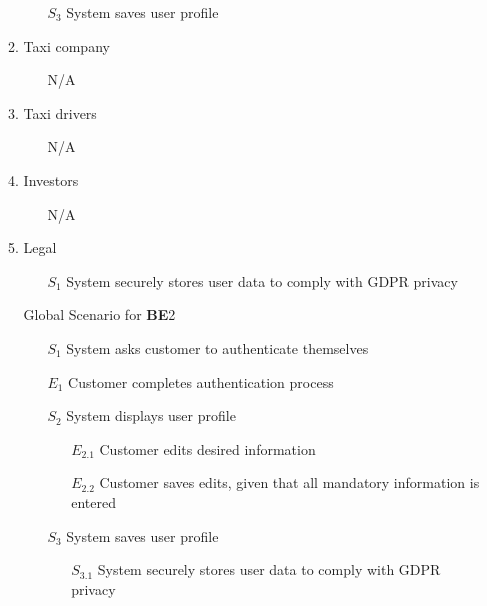 \documentclass[]{article}
\begin{document}
\begin{enumerate}[{\textbf{BE}}1.]
\begin{enumerate}[{\textbf{VP2}}.1]
\begin{enumerate}
                \item[$S_3$] System saves user profile
            \end{enumerate}
        \item Taxi company
            \begin{enumerate}
                \item[N/A]
            \end{enumerate}
        \item Taxi drivers
            \begin{enumerate}
                \item[N/A]
            \end{enumerate}
        \item Investors
            \begin{enumerate}
                \item[N/A]
            \end{enumerate}
        \item Legal
            \begin{enumerate}
                \item[$S_1$] System securely stores user data to comply with GDPR privacy
            \end{enumerate}
        \item[Global] Scenario for \textbf{BE}2
            \begin{enumerate}
                \item[$S_1$] System asks customer to authenticate themselves
                    \item[$E_1$] Customer completes authentication process
                \item[$S_2$] System displays user profile
                \begin{enumerate}
                    \item[$E_{2.1}$] Customer edits desired information
                    \item[$E_{2.2}$] Customer saves edits, given that all mandatory information is entered
                \end{enumerate}
                \item[$S_3$] System saves user profile
                \begin{enumerate}
                    \item[$S_{3.1}$] System securely stores user data to comply with GDPR privacy
                \end{enumerate}
            \end{enumerate}
    \end{enumerate}



\end{enumerate}
\end{document}
